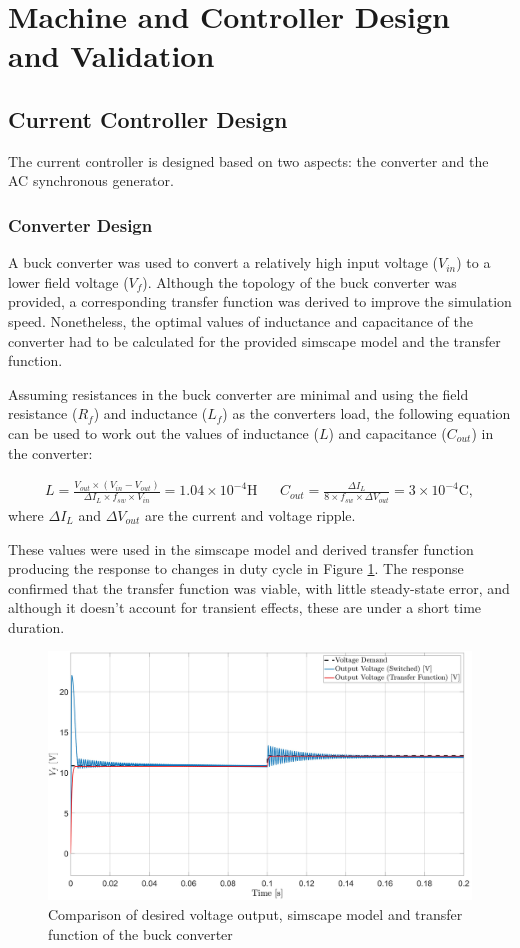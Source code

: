 \section{Machine and Controller Design and Validation}
    \subsection{Current Controller Design}
        The current controller is designed based on two aspects: the converter and the AC synchronous generator.
        \subsubsection{Converter Design}
            A buck converter was used to convert a relatively high input voltage (\(V_{in}\)) to a lower field voltage (\(V_{f}\)). Although the topology of the buck converter was provided, a corresponding transfer function was derived to improve the simulation speed. Nonetheless, the optimal values of inductance and capacitance of the converter had to be calculated for the provided simscape model and the transfer function. 
            
            Assuming resistances in the buck converter are minimal and using the field resistance (\(R_f\)) and inductance (\(L_f\)) as the converters load, the following equation can be used to work out the values of inductance (\(L\)) and capacitance (\(C_{out}\)) in the converter:

            \begin{align}
                L = \frac{V_{out}\times(V_{in} - V_{out})}{\Delta I_L \times f_{sw} \times V_{in}} = 1.04 \times 10^{-4} \text{H} && C_{out} = \frac{\Delta I_L}{8 \times f_{sw} \times \Delta V_{out}} = 3 \times 10^{-4} \text{C},
            \end{align}
            where \(\Delta I_L\) and \(\Delta V_{out}\) are the current and voltage ripple.

            These values were used in the simscape model and derived transfer function producing the response to changes in duty cycle in Figure \ref{fig: converter output}. The response confirmed that the transfer function was viable, with little steady-state error, and although it doesn't account for transient effects, these are under a short time duration.
            \begin{figure}[tbh!]
                \centering
                \includegraphics[width=0.5\linewidth]{PEMDT Exam Report/img/ConverterResponse.jpg}
                \caption{Comparison of desired voltage output, simscape model and transfer function of the buck converter}
                \label{fig: converter output}
            \end{figure}

